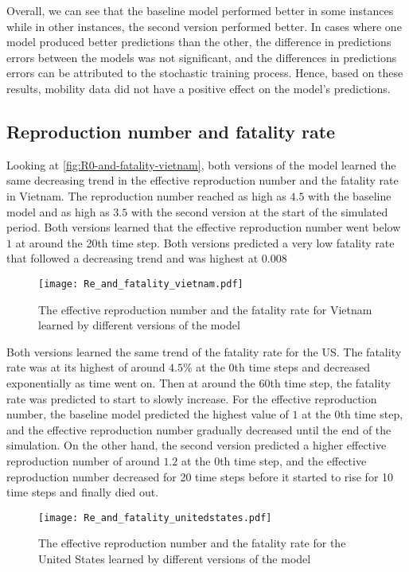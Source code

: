 Overall, we can see that the baseline model performed better in some instances while in other instances, the second version performed better.
In cases where one model produced better predictions than the other, the difference in predictions errors between the models was not significant, and the differences in predictions errors can be attributed to the stochastic training process.
Hence, based on these results, mobility data did not have a positive effect on the model's predictions.

\subsection{Reproduction number and fatality rate}

Looking at \autoref{fig:R0-and-fatality-vietnam}, both versions of the model learned the same decreasing trend in the effective reproduction number and the fatality rate in Vietnam.
The reproduction number reached as high as $4.5$ with the baseline model and as high as $3.5$ with the second version at the start of the simulated period.
Both versions learned that the effective reproduction number went below $1$ at around the 20th time step.
Both versions predicted a very low fatality rate that followed a decreasing trend and was highest at $0.008$

\begin{figure}[!htb]
    \centering
    \texttt{[image: Re\_and\_fatality\_vietnam.pdf]}
    \caption{The effective reproduction number and the fatality rate for Vietnam learned by different versions of the model}
    \label{fig:R0-and-fatality-vietnam}
\end{figure}

Both versions learned the same trend of the fatality rate for the \gls{US}.
The fatality rate was at its highest of around $4.5$\% at the 0th time steps and decreased exponentially as time went on.
Then at around the 60th time step, the fatality rate was predicted to start to slowly increase.
For the effective reproduction number, the baseline model predicted the highest value of $1$ at the 0th time step, and the effective reproduction number gradually decreased until the end of the simulation.
On the other hand, the second version predicted a higher effective reproduction number of around $1.2$ at the 0th time step, and the effective reproduction number decreased for 20 time steps before it started to rise for 10 time steps and finally died out.

\begin{figure}[!htb]
    \centering
    \texttt{[image: Re\_and\_fatality\_unitedstates.pdf]}
    \caption{The effective reproduction number and the fatality rate for the United States learned by different versions of the model}
    \label{fig:R0-and-fatality-usa}
\end{figure}
